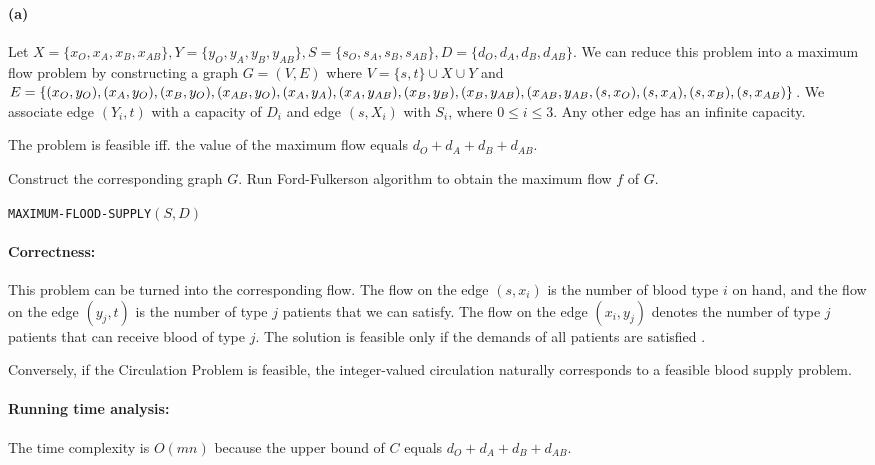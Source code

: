 \documentclass[paper=a4, fontsize=12pt]{scrartcl} %
\numberwithin{equation}{section} %
\numberwithin{figure}{section} %
\numberwithin{table}{section} %
\begin{document}
\paragraph{(a)}
Let $X = \{x_O,x_A,x_B,x_{AB}\}, Y=\{y_O,y_A,y_B,y_{AB}\}, S=\{s_O,s_A,s_B,s_{AB}\}, D = \{d_O,d_A,d_B,d_{AB}\}$.
We can reduce this problem into a maximum flow problem by constructing a graph $G = (V,E)$ where $V=\{s,t\} \cup X \cup Y$ and $E=\{(x_O,y_O),(x_A,y_O),(x_B,y_O),(x_{AB},y_O),(x_A,y_A),(x_A,y_{AB}),\\(x_B,y_B),(x_B,y_{AB}),(x_{AB},y_{AB},(s,x_O),(s,x_A),(s,x_B),(s,x_{AB})\}$. We associate edge $(Y_i, t)$ with a capacity of $D_i$ and edge $(s, X_i)$ with $S_i$, where $0 \leq i \leq 3$. Any other edge has an infinite capacity. \par 
The problem is feasible iff. the value of the maximum flow equals $d_O+d_A+d_B+d_{AB}$. 

\begin{algorithm}[H] 
\SetAlgoLined
\SetNoFillComment
\DontPrintSemicolon
{}
Construct the corresponding graph $G$. \;
Run Ford-Fulkerson algorithm to obtain the maximum flow $f$ of $G$. \;
\caption{\texttt{MAXIMUM-FLOOD-SUPPLY}$(S,D)$}
\end{algorithm}
\paragraph{Correctness:} This problem can be turned into the corresponding flow. The flow on the edge $(s,x_i)$ is the number of blood type $i$ on hand, and the flow on the edge $(y_j,t)$ is the number of type $j$ patients that we can satisfy. The flow on the edge $(x_i,y_j)$ denotes the number of type $j$ patients that can receive blood of type $j$. The solution is feasible only if the demands of all patients are satisfied .\par
Conversely, if the Circulation Problem is feasible, the integer-valued circulation naturally corresponds to a feasible blood supply problem.

\paragraph{Running time analysis:} The time complexity is $O(mn)$ because the upper bound of $C$ equals $d_O+d_A+d_B+d_{AB}$. 
\end{document}
